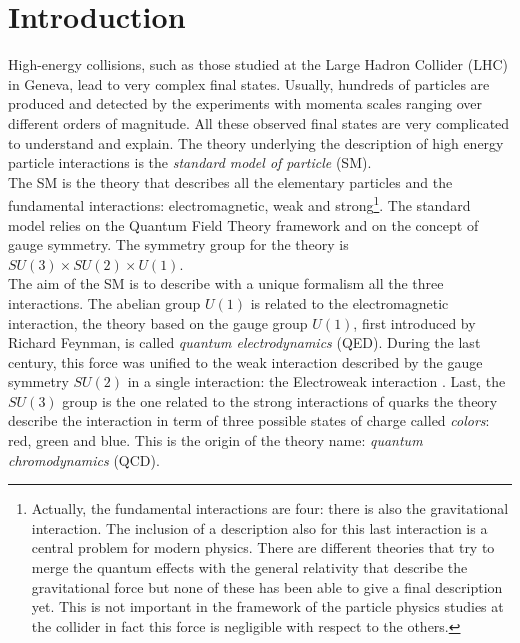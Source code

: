 %
%

\chapter{Introduction}

\setcounter{page}{1}

High-energy collisions, such as those studied at the Large Hadron Collider (LHC) in Geneva, lead to very complex final states. Usually, hundreds of particles are produced and detected by the experiments with momenta scales ranging over different orders of magnitude. All these observed final states are very complicated to understand and explain. The theory underlying the description of high energy particle interactions is the \emph{standard model of particle} (SM). 
\\
The SM is the theory that describes all the elementary particles and the fundamental interactions: electromagnetic, weak and strong\footnote{Actually, the fundamental interactions are four: there is also the gravitational interaction. The inclusion of a description also for this last interaction is a central problem for modern physics. There are different theories that try to merge the quantum effects with the general relativity that describe the gravitational force but none of these has been able to give a final description yet. This is not important in the framework of the particle physics studies at the collider in fact this force is negligible with respect to the others.  }. The standard model relies on the Quantum Field Theory framework and on the concept of gauge symmetry. The symmetry group for the theory is $SU(3)\times SU(2)\times U(1)$. 
\\
The aim of the SM is to describe with a unique formalism all the three interactions. The abelian group $U(1)$ is related to the electromagnetic interaction, the theory based on the gauge group $U(1)$, first introduced by Richard Feynman, is called \textit{quantum electrodynamics} (QED). During the last century, this force was unified to the weak interaction described by the gauge symmetry $SU(2)$ in a single interaction: the Electroweak interaction \cite{PhysRevLett.19.1264}. Last, the $SU(3)$ group is the one related to the strong interactions of quarks the theory describe the interaction in term of three possible states of charge called \textit{colors}: red, green and blue. This is the origin of the theory name: \textit{quantum chromodynamics} (QCD). 

